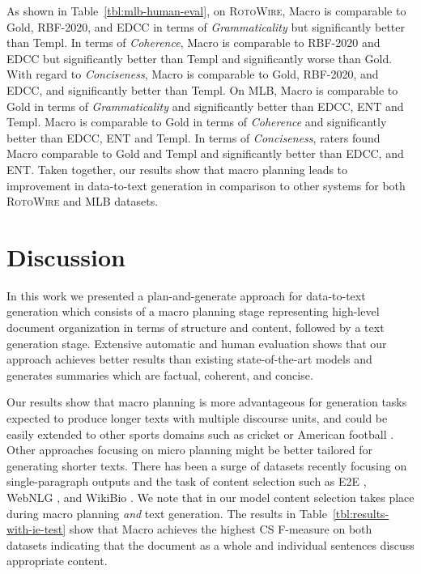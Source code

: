 \documentclass[11pt,a4paper]{article}
\begin{document}
As shown in Table~\ref{tbl:mlb-human-eval}, on \textsc{RotoWire},
Macro is comparable to Gold, RBF-2020, and EDCC in terms of
\emph{Grammaticality} but significantly better than Templ.  In terms
of \emph{Coherence}, Macro is comparable to
RBF-2020 and EDCC but significantly better than Templ and 
significantly worse than Gold.
With regard to \emph{Conciseness}, Macro is comparable to Gold,
RBF-2020, and EDCC, and significantly better than
Templ. On MLB, Macro is comparable to Gold in terms of
\emph{Grammaticality} and significantly better than EDCC, ENT and Templ.
Macro is comparable to Gold in terms of \emph{Coherence} and
significantly better than EDCC, ENT and Templ. In terms of
\emph{Conciseness}, raters found Macro comparable to Gold and Templ
and significantly better than EDCC, and ENT.  Taken together, our results show that macro planning leads to improvement 
in data-to-text generation in comparison to other systems for both 
\textsc{RotoWire} and MLB datasets.

\section{Discussion}

In this work we presented a plan-and-generate approach for
data-to-text generation which consists of a macro planning stage
representing high-level document organization in terms of structure
and content, followed by a text generation stage.  Extensive automatic
and human evaluation shows that our approach achieves better results
than existing state-of-the-art models and generates summaries which
are factual, coherent, and concise. 


Our results show that macro planning is more advantageous for
generation tasks expected to produce longer texts with multiple
discourse units, and could be easily extended to other sports domains
such as cricket \cite{kelly-etal-2009-investigating} or American
football \cite{barzilay-lapata-2005-collective}.
Other approaches focusing on micro planning
\cite{DBLP:journals/corr/abs-1809-00582,moryossef-etal-2019-step}
might be better tailored for generating shorter texts. There has been
a surge of datasets recently focusing on single-paragraph outputs and
the task of content selection such as E2E
\cite{novikova-etal-2017-e2e}, WebNLG
\cite{gardent-etal-2017-creating}, and WikiBio
\cite{lebret-etal-2016-neural,perez-beltrachini-lapata-2018-bootstrapping}.
We note that in our model content selection takes place during macro
planning \emph{and} text
generation. The results in Table~\ref{tbl:results-with-ie-test} show that Macro
achieves the highest CS F-measure on both datasets indicating that the
document as a whole and individual sentences discuss appropriate
content.
\end{document}
